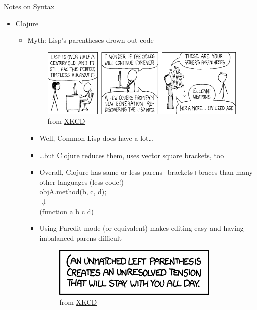 \documentclass{beamer}
\begin{document}
\begin{frame}[allowframebreaks]{Notes on Syntax}
  \begin{itemize}
  \item Clojure
    \begin{itemize}
    \item Myth: Lisp's parentheses drown out code\\
      \begin{figure}
      \includegraphics[width=\linewidth]{lisp_cycles.png}
      \caption{from \href{http://xkcd.com/297/}{XKCD}}
      \end{figure}
      \begin{itemize}
      \item Well, Common Lisp does have a lot\ldots
      \item \ldots but Clojure reduces them, uses vector square brackets, too
      \item Overall, Clojure has same or less parens+brackets+braces
        than many other languages (less
        code!)\\
{\ttfamily\color{black}
%
objA.method(b, c, d);}\\
$\Downarrow$\\
{\ttfamily\color{black}
\textcolor[rgb]{0.54901963,0.54901963,0.54901963}{(}function a b c d\textcolor[rgb]{0.54901963,0.54901963,0.54901963}{)}}
      \item Using Paredit mode (or equivalent) makes editing easy and
        having imbalanced parens difficult\\
        \begin{figure}
          \includegraphics[width=0.8\linewidth]{left-paren.png}
          \caption{from \href{http://xkcd.com/859/}{XKCD}}
        \end{figure}

\end{itemize}
\end{itemize}
\end{itemize}
\end{frame}
\end{document}
